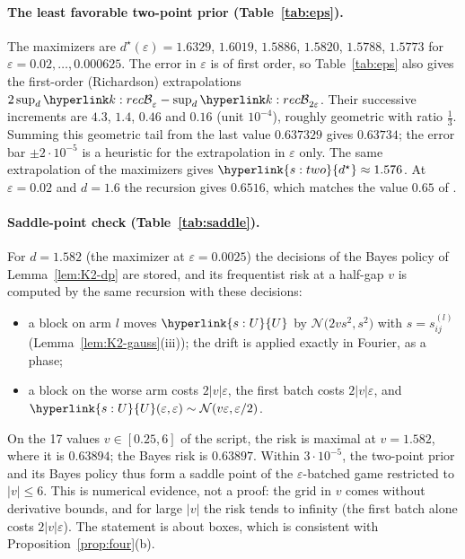 \documentclass[11pt]{article}
\DeclareRobustCommand{\sy}[2]{{\hyperlink{#1}{#2}}}
\newcommand{\1}{\mathbf{1}}
\newcommand{\Ud}{\sy{s:U}{U}}
\newcommand{\dst}{\sy{s:two}{d^\star}}
\begin{document}
\paragraph{The least favorable two-point prior (Table~\ref{tab:eps}).} The maximizers are $d^\star(\varepsilon)=1.6329$, $1.6019$, $1.5886$, $1.5820$, $1.5788$, $1.5773$
for $\varepsilon=0.02,\dots,0.000625$. The error in $\varepsilon$ is of first order, so Table~\ref{tab:eps} also gives the first-order (Richardson) extrapolations
$2\sup_d\kB_\varepsilon-\sup_d\kB_{2\varepsilon}$. Their successive increments are $4.3$, $1.4$, $0.46$ and $0.16$ (unit $10^{-4}$), roughly geometric with ratio
$\frac13$. Summing this geometric tail from the last value $0.637329$ gives $0.63734$; the error bar $\pm2\cdot10^{-5}$ is a heuristic for the extrapolation in $\varepsilon$
only. The same extrapolation of the maximizers gives $\dst\approx1.576$. At $\varepsilon=0.02$ and $d=1.6$ the recursion gives $0.6516$, which matches the value $0.65$
of \citet{Kol17}.

\paragraph{Saddle-point check (Table~\ref{tab:saddle}).} For $d=1.582$ (the maximizer at $\varepsilon=0.0025$) the decisions of the Bayes policy of
Lemma~\ref{lem:K2-dp} are stored, and its frequentist risk at a half-gap $v$ is computed by the same recursion with these decisions:
\begin{itemize}
\item a block on arm $l$ moves $\Ud$ by $\mathcal N\big(2v s^2,s^2\big)$ with $s=s^{(l)}_{ij}$ (Lemma~\ref{lem:K2-gauss}(iii)); the drift is applied exactly in Fourier, as a phase;
\item a block on the worse arm costs $2|v|\varepsilon$, the first batch costs $2|v|\varepsilon$, and $\Ud(\varepsilon,\varepsilon)\sim\mathcal N(v\varepsilon,\varepsilon/2)$.
\end{itemize}
On the 17 values $v\in[0.25,6]$ of the script, the risk is maximal at $v=1.582$, where it is $0.63894$; the Bayes risk is $0.63897$. Within $3\cdot10^{-5}$, the
two-point prior and its Bayes policy thus form a saddle point of the $\varepsilon$-batched game restricted to $|v|\le6$. This is numerical evidence, not a proof: the
grid in $v$ comes without derivative bounds, and for large $|v|$ the risk tends to infinity (the first batch alone costs $2|v|\varepsilon$). The statement is about boxes,
which is consistent with Proposition~\ref{prop:four}(b).
\end{document}

